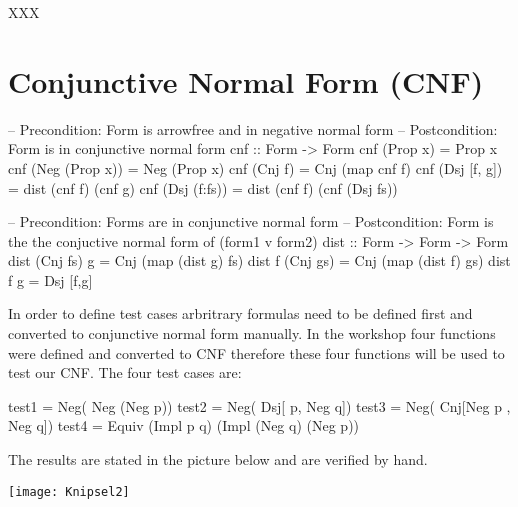 \documentclass{article}
\begin{document}
XXX

\section*{Conjunctive Normal Form (CNF)}

\begin{code}
-- Precondition: Form is arrowfree and in negative normal form
-- Postcondition: Form is in conjunctive normal form
cnf :: Form -> Form
cnf (Prop x)		= Prop x
cnf (Neg (Prop x))	= Neg (Prop x)
cnf (Cnj f)		= Cnj (map cnf f)
cnf (Dsj [f, g])	= dist (cnf f) (cnf g)
cnf (Dsj (f:fs))	= dist (cnf f) (cnf (Dsj fs))

-- Precondition: Forms are in conjunctive normal form
-- Postcondition: Form is the the conjuctive normal form of (form1 v form2)
dist :: Form -> Form -> Form
dist (Cnj fs) g 	= Cnj (map (dist g) fs)
dist f (Cnj gs)		= Cnj (map (dist f) gs)
dist f g 		= Dsj [f,g]

\end{code}

In order to define test cases arbritrary formulas need to be defined first and converted to conjunctive normal form manually. In the workshop four functions were defined and converted to CNF therefore these four functions will be used to test our CNF. 
The four test cases are:

\begin{code}
test1 = Neg( Neg (Neg p))
test2 = Neg( Dsj[ p, Neg q])
test3 = Neg( Cnj[Neg p , Neg q])
test4 = Equiv (Impl p q) (Impl (Neg q) (Neg p))
\end{code}

The results are stated in the picture below and are verified by hand.

\texttt{[image: Knipsel2]}
\end{document}
